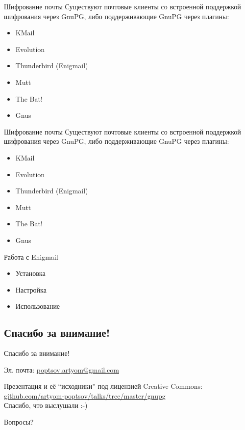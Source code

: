 \documentclass[presentation]{beamer}
\begin{document}
\begin{frame}[fragile]{Шифрование почты}
  Существуют почтовые клиенты со встроенной поддержкой шифрования
  через GnuPG, либо поддерживающие GnuPG через плагины:
  \begin{itemize}
  \item KMail
  \item Evolution
  \item Thunderbird (Enigmail)
  \item Mutt
  \item The Bat!
  \item Gnus
  \end{itemize}
\end{frame}

\begin{frame}[fragile]{Шифрование почты}
  Существуют почтовые клиенты со встроенной поддержкой шифрования
  через GnuPG, либо поддерживающие GnuPG через плагины:
  \begin{itemize}
  \item KMail
  \item Evolution
  \item \alert{Thunderbird (Enigmail)}
  \item Mutt
  \item The Bat!
  \item Gnus
  \end{itemize}
\end{frame}

\begin{frame}[fragile]{Работа с Enigmail}
  \begin{itemize}
  \item Установка
  \item Настройка
  \item Использование
  \end{itemize}
\end{frame}



\subsection{Спасибо за внимание!}

\begin{frame}{Спасибо за внимание!}
  \large

  Эл. почта: \url{poptsov.artyom@gmail.com}

  \medskip

  Презентация и её ``исходники'' под лицензией Creative Commons:
  \url{github.com/artyom-poptsov/talks/tree/master/gnupg} \\[10pt]

  Спасибо, что выслушали  :-) \\[30pt]

  \bigskip

  \huge Вопросы?
\end{frame}
\end{document}
